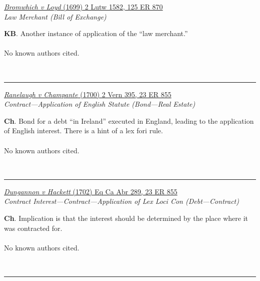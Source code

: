 \documentclass[twoside]{article}
\begin{document}
        \begin{small}
        \begin{center}
        \href{https://heinonline.org/HOL/P?h=hein.engrep/engrg0125&i=874}{\textit{Bromwhich v Loyd} (1699) 2 Lutw 1582, 125 ER 870} \label{2} \\ 
\textit{Law Merchant (Bill of Exchange)}\\
        \end{center}
        \textbf{KB}. Another instance of application of the “law merchant.”\\\\No known authors cited.
        \end{small}\\
        \rule{\textwidth}{0.5pt}
        

        \begin{small}
        \begin{center}
        \href{https://heinonline.org/HOL/P?h=hein.engrep/engrc0023&i=863}{\textit{Ranelaugh v Champante} (1700) 2 Vern 395, 23 ER 855} \label{17} \\ 
\textit{Contract---Application of English Statute (Bond---Real Estate)}\\
        \end{center}
        \textbf{Ch}. Bond for a debt “in Ireland” executed in England, leading to the application of English interest. There is a hint of a lex fori rule.\\\\No known authors cited.
        \end{small}\\
        \rule{\textwidth}{0.5pt}
        

        \begin{small}
        \begin{center}
        \href{https://heinonline.org/HOL/P?h=hein.engrep/engrc0023&i=863}{\textit{Dungannon v Hackett} (1702) Eq Ca Abr 289, 23 ER 855} \label{18} \\ 
\textit{Contract Interest---Contract---Application of Lex Loci Con (Debt---Contract)}\\
        \end{center}
        \textbf{Ch}. Implication is that the interest should be determined by the place where it was contracted for.\\\\No known authors cited.
        \end{small}\\
        \rule{\textwidth}{0.5pt}
        
\end{document}
